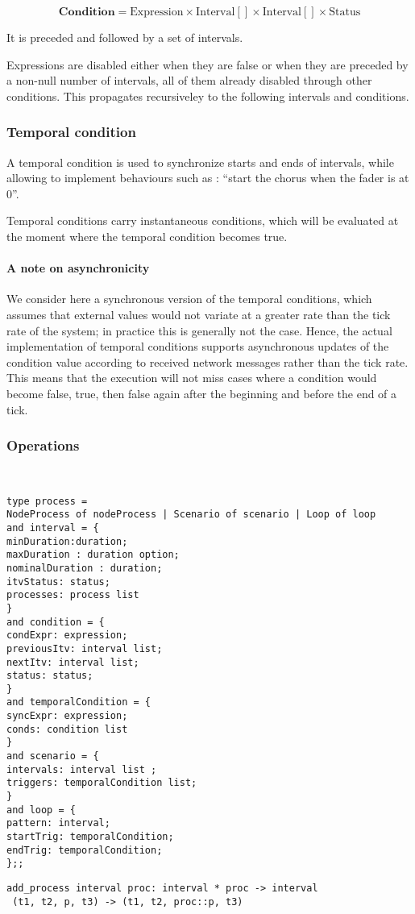 \documentclass[applsci,article,submit,moreauthors,pdftex,10pt,a4paper]{mdpi}
\begin{document}
\[
\mathbf{Condition} = \mathrm{Expression} \times \mathrm{Interval}[] \times \mathrm{Interval}[] \times \mathrm{Status}
\]

It is preceded and followed by a set of intervals.

Expressions are disabled either when they are false or when they are preceded by a non-null number of intervals, all of them already disabled through other conditions. This propagates recursiveley to the following intervals and conditions. 

\subsubsection{Temporal condition}
A temporal condition is used to synchronize starts and ends of intervals, while allowing to implement behaviours such as : ``start the chorus when the fader is at 0''.

Temporal conditions carry instantaneous conditions, which will be evaluated at the moment where the temporal condition becomes true.

\paragraph{A note on asynchronicity}
We consider here a synchronous version of the temporal conditions, which assumes that external values would not variate at a greater rate than the tick rate of the system; in practice this is generally not the case. Hence, the actual implementation of temporal conditions supports asynchronous updates of the condition value according to received network messages rather than the tick rate. 
This means that the execution will not miss cases where a condition would become false, true, then false again after the beginning and before the end of a tick.

\subsubsection{Operations}
\begin{lstlisting}


type process = 
NodeProcess of nodeProcess | Scenario of scenario | Loop of loop
and interval = {
minDuration:duration;
maxDuration : duration option;
nominalDuration : duration;
itvStatus: status;
processes: process list
}
and condition = { 
condExpr: expression; 
previousItv: interval list; 
nextItv: interval list; 
status: status; 
}
and temporalCondition = { 
syncExpr: expression; 
conds: condition list
}
and scenario = { 
intervals: interval list ; 
triggers: temporalCondition list; 
}
and loop = { 
pattern: interval; 
startTrig: temporalCondition;
endTrig: temporalCondition; 
};;

\end{lstlisting}
\begin{lstlisting}
add_process interval proc: interval * proc -> interval
 (t1, t2, p, t3) -> (t1, t2, proc::p, t3)
\end{lstlisting}
\end{document}
